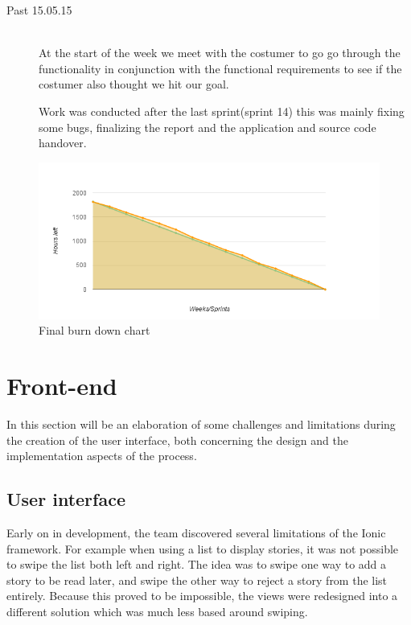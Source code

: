 \begin{description}
	\item[Past 15.05.15] \hfill \\ 
	At the start of the week we meet with the costumer to go go through the functionality in conjunction with the functional requirements to see if the costumer also thought we hit our goal.
	  
	Work was conducted after the last sprint(sprint 14) this was mainly fixing some bugs, finalizing the report and the application and source code handover.
	
\end{description}

\begin{figure}[h!]
	\centering
	\includegraphics[width=\textwidth]{fig/burnDownAfter}
	\caption{Final burn down chart}
	\label{Fig:burnDownAfter}
\end{figure}

\section{Front-end}

In this section will be an elaboration of some challenges and limitations during the creation of the user interface, both concerning the design and the implementation aspects of the process.

\subsection{User interface}
\label{subsec:user_interface}

Early on in development, the team discovered several limitations of the Ionic framework. For example when using a list to display stories, it was not possible to swipe the list both left and right. The idea was to swipe one way to add a story to be read later, and swipe the other way to reject a story from the list entirely.  Because this proved to be impossible, the views were redesigned into a different solution which was much less based around swiping.\newline

